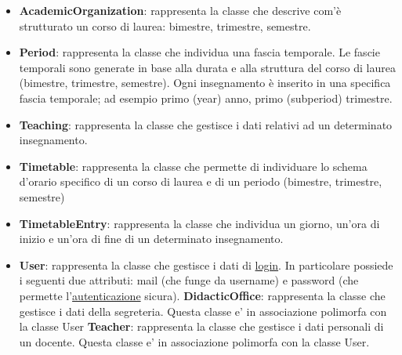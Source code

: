 \documentclass[11pt,a4paper]{article}
\begin{document}
\begin{itemize}
\item \textbf{AcademicOrganization}: rappresenta la classe che descrive com'è strutturato un corso di laurea: bimestre, trimestre, semestre.

\item \textbf{Period}: rappresenta la classe che individua una fascia temporale.
Le fascie temporali sono generate in base alla durata e alla struttura del corso di laurea (bimestre, trimestre, semestre). Ogni insegnamento è inserito in una specifica fascia temporale; ad esempio primo (year) anno, primo (subperiod) trimestre.

\item \textbf{Teaching}: rappresenta la classe che gestisce i dati relativi ad un determinato insegnamento.

\item \textbf{Timetable}: rappresenta la classe che permette di individuare lo schema d'orario specifico di un corso di laurea e di un periodo (bimestre, trimestre, semestre) 

\item \textbf{TimetableEntry}: rappresenta la classe che individua un giorno, un'ora di inizio e un'ora di fine di un determinato insegnamento.

\item \textbf{User}: rappresenta la classe che gestisce i dati di \underline{login}. In particolare possiede i seguenti due attributi: mail (che funge da username) e password (che permette l'\underline{autenticazione} sicura).
\subitem \textbf{DidacticOffice}: rappresenta la classe che gestisce i dati della segreteria. 
Questa classe e' in associazione polimorfa con la classe User 
\subitem \textbf{Teacher}: rappresenta la classe che gestisce i dati personali di un docente.
Questa classe e' in associazione polimorfa con la classe User. 
\end{itemize}

\newpage
\end{document}
